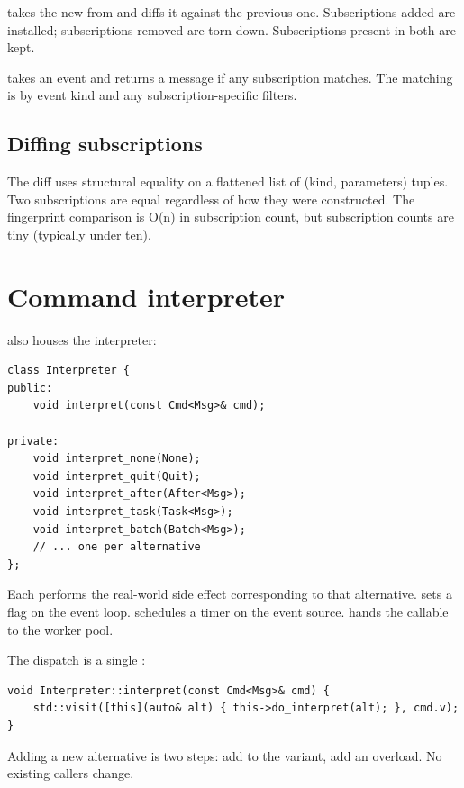  takes the new  from
 and diffs it against the previous one.
Subscriptions added are installed; subscriptions removed are
torn down. Subscriptions present in both are kept.

 takes an event and returns a message if any
subscription matches. The matching is by event kind and any
subscription-specific filters.

\subsection*{Diffing subscriptions}

The diff uses structural equality on a flattened list of
(kind, parameters) tuples. Two 
subscriptions are equal regardless of how they were constructed.
The fingerprint comparison is O(n) in subscription count, but
subscription counts are tiny (typically under ten).

\section{Command interpreter}

 also houses the interpreter:

\begin{lstlisting}
class Interpreter {
public:
    void interpret(const Cmd<Msg>& cmd);

private:
    void interpret_none(None);
    void interpret_quit(Quit);
    void interpret_after(After<Msg>);
    void interpret_task(Task<Msg>);
    void interpret_batch(Batch<Msg>);
    // ... one per alternative
};
\end{lstlisting}

Each  performs the real-world side effect
corresponding to that alternative.  sets a
flag on the event loop.  schedules a
timer on the event source.  hands the
callable to the worker pool.

The dispatch is a single :

\begin{lstlisting}
void Interpreter::interpret(const Cmd<Msg>& cmd) {
    std::visit([this](auto& alt) { this->do_interpret(alt); }, cmd.v);
}
\end{lstlisting}

Adding a new  alternative is two steps: add to the
variant, add an  overload. No existing callers
change.

